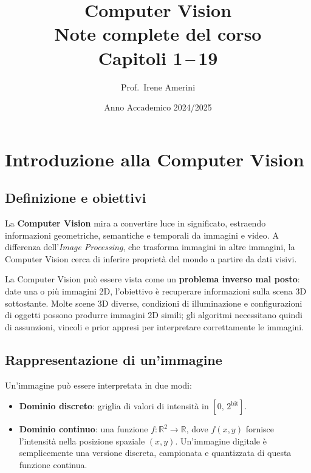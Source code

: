 \documentclass[12pt, a4paper]{report}
\title{%
  \vspace{-1cm}
  {\LARGE\bfseries Computer Vision}\\[0.6em]
  {\large Note complete del corso}\\[0.3em]
  {\normalsize Capitoli 1\,--\,19}
}
\author{Prof.\ Irene Amerini}
\date{Anno Accademico 2024/2025}
\newcommand{\R}{\mathbb{R}}
\begin{document}
\maketitle
\tableofcontents
\newpage

\chapter{Introduzione alla Computer Vision}

\section{Definizione e obiettivi}

La \textbf{Computer Vision} mira a convertire luce in significato, estraendo informazioni
geometriche, semantiche e temporali da immagini e video.  A differenza
dell'\textit{Image Processing}, che trasforma immagini in altre immagini, la Computer
Vision cerca di inferire proprietà del mondo a partire da dati visivi.

\begin{defbox}
La Computer Vision può essere vista come un \textbf{problema inverso mal posto}: date
una o più immagini 2D, l'obiettivo è recuperare informazioni sulla scena 3D
sottostante.  Molte scene 3D diverse, condizioni di illuminazione e configurazioni
di oggetti possono produrre immagini 2D simili; gli algoritmi necessitano quindi di
assunzioni, vincoli e prior appresi per interpretare correttamente le immagini.
\end{defbox}

\section{Rappresentazione di un'immagine}

Un'immagine può essere interpretata in due modi:

\begin{itemize}
  \item \textbf{Dominio discreto}: griglia di valori di intensità in $[0,\,2^{\text{bit}}]$.
  \item \textbf{Dominio continuo}: una funzione $f:\R^2\to\R$, dove $f(x,y)$ fornisce
        l'intensità nella posizione spaziale $(x,y)$.  Un'immagine digitale è
        semplicemente una versione discreta, campionata e quantizzata di questa funzione
        continua.
\end{itemize}
\end{document}
